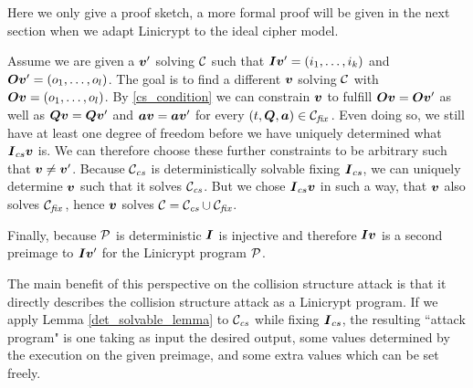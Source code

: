Here we only give a proof sketch,
a more formal proof will be given in the next section when we adapt Linicrypt to the ideal cipher model.
\begin{sketch}
Assume we are given a $\vv'$ solving $\C$ such that $\I \vv' = \vec i k$ and $\O \vv' = \vec o l$.
The goal is to find a different $\vv$ solving $\C$ with $\O \vv = \vec o l$.
By \eqref{cs_condition} we can constrain $\vv$ to fulfill $\O \vv = \O \vv'$
as well as $\Q \vv = \Q \vv'$ and $\va\vv = \va\vv'$ for every $(t, \Q, \va) \in \Cfix\,$.
Even doing so, we still have at least one degree of freedom before we have uniquely determined what
$\I_{cs} \vv$ is.
We can therefore choose these further constraints to be arbitrary such that $\vv \neq \vv'$.
Because $\Ccs$ is deterministically solvable fixing $\I_{cs}$,
we can uniquely determine $\vv$ such that it solves $\Ccs$.
But we chose $\I_{cs} \vv$ in such a way, that $\vv$ also solves $\Cfix\,$,
hence $\vv$ solves $\C = \Ccs \cup \Cfix$.

Finally, because $\P$ is deterministic $\I$ is injective and therefore
$\I\vv$ is a second preimage to $\I\vv'$ for the Linicrypt program $\P$.
\end{sketch}

The main benefit of this perspective on the collision structure attack is
that it directly describes the collision structure attack as a Linicrypt program.
If we apply Lemma \ref{det_solvable_lemma} to $\Ccs$ while fixing $\I_{cs}$,
the resulting ``attack program" is one taking as input the desired output,
some values determined by the execution on the given preimage,
and some extra values which can be set freely.


